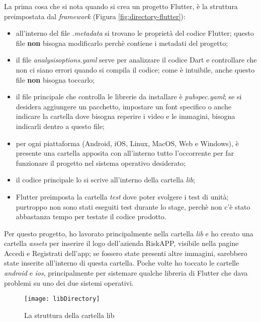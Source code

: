La prima cosa che si nota quando si crea un progetto Flutter, è la struttura preimpostata dal \emph{framework} (Figura \ref{fig:directory-flutter}):
\begin{itemize}
    \item all'interno del file \emph{.metadata} si trovano le proprietà del codice Flutter; questo file \textbf{non} bisogna modificarlo perchè contiene i metadati del progetto;
    \item il file \emph{analysis\textunderscore options.yaml} serve per analizzare il codice Dart e controllare che non ci siano errori quando si compila il codice; come è intuibile, anche questo file \textbf{non} bisogna toccarlo;
    \item il file principale che controlla le librerie da installare è \emph{pubspec.yaml}; se si desidera aggiungere un pacchetto, impostare un font specifico o anche indicare la cartella dove bisogna reperire i video e le immagini, bisogna indicarli dentro a questo file;
    \item per ogni piattaforma (Android, iOS, Linux, MacOS, Web e Windows), è presente una cartella apposita con all'interno tutto l'occorrente per far funzionare il progetto nel sistema operativo desiderato;
    \item il codice principale lo si scrive all'interno della cartella \emph{lib};
    \item Flutter preimposta la cartella \emph{test} dove poter svolgere i test di unità; purtroppo non sono stati eseguiti test durante lo stage, perchè non c'è stato abbastanza tempo per testate il codice prodotto.
\end{itemize}
Per questo progetto, ho lavorato principalmente nella cartella \emph{lib} e ho creato una cartella \emph{assets} per inserire il logo dell'azienda RiskAPP, visibile nella pagine Accedi e Registrati dell'app; se fossero state presenti altre immagini, sarebbero state inserite all'interno di questa cartella.\newline
Poche volte ho toccato le cartelle \emph{android} e \emph{ios}, principalmente per sistemare qualche libreria di Flutter che dava problemi su uno dei due sistemi operativi. 
\begin{figure}[!h] 
    \centering 
    \texttt{[image: libDirectory]} 
    \caption{La struttura della cartella lib}
    \label{fig:directory-lib}
\end{figure}

